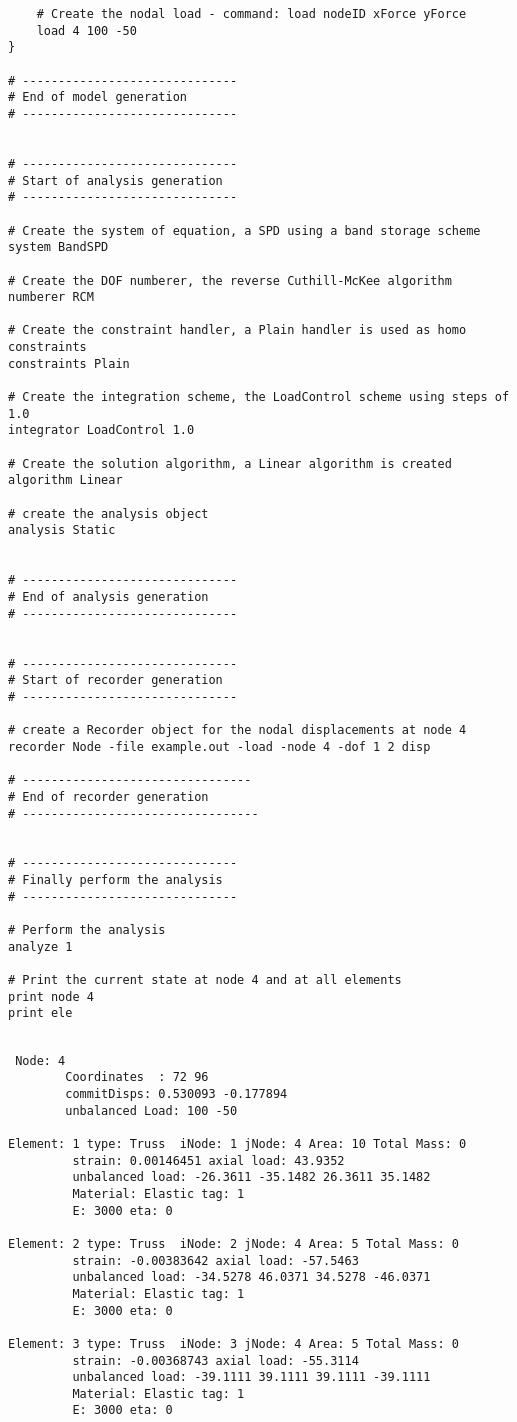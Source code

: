 \documentclass[12pt]{article}
\begin{document}
{\begin{verbatim}
    # Create the nodal load - command: load nodeID xForce yForce
    load 4 100 -50
}

# ------------------------------
# End of model generation
# ------------------------------


# ------------------------------
# Start of analysis generation
# ------------------------------

# Create the system of equation, a SPD using a band storage scheme
system BandSPD

# Create the DOF numberer, the reverse Cuthill-McKee algorithm
numberer RCM

# Create the constraint handler, a Plain handler is used as homo constraints
constraints Plain

# Create the integration scheme, the LoadControl scheme using steps of 1.0
integrator LoadControl 1.0

# Create the solution algorithm, a Linear algorithm is created
algorithm Linear

# create the analysis object 
analysis Static 


# ------------------------------
# End of analysis generation
# ------------------------------


# ------------------------------
# Start of recorder generation
# ------------------------------

# create a Recorder object for the nodal displacements at node 4
recorder Node -file example.out -load -node 4 -dof 1 2 disp

# --------------------------------
# End of recorder generation
# ---------------------------------


# ------------------------------
# Finally perform the analysis
# ------------------------------

# Perform the analysis
analyze 1

# Print the current state at node 4 and at all elements
print node 4
print ele


\end{verbatim}
}


\vspace{0.2in} 

{\sf\small
\begin{verbatim}
 Node: 4
        Coordinates  : 72 96 
        commitDisps: 0.530093 -0.177894 
        unbalanced Load: 100 -50 

Element: 1 type: Truss  iNode: 1 jNode: 4 Area: 10 Total Mass: 0 
         strain: 0.00146451 axial load: 43.9352 
         unbalanced load: -26.3611 -35.1482 26.3611 35.1482 
         Material: Elastic tag: 1
         E: 3000 eta: 0

Element: 2 type: Truss  iNode: 2 jNode: 4 Area: 5 Total Mass: 0 
         strain: -0.00383642 axial load: -57.5463 
         unbalanced load: -34.5278 46.0371 34.5278 -46.0371 
         Material: Elastic tag: 1
         E: 3000 eta: 0

Element: 3 type: Truss  iNode: 3 jNode: 4 Area: 5 Total Mass: 0 
         strain: -0.00368743 axial load: -55.3114 
         unbalanced load: -39.1111 39.1111 39.1111 -39.1111 
         Material: Elastic tag: 1
         E: 3000 eta: 0
\end{verbatim}
}
\end{document}
